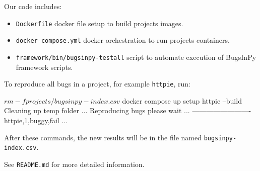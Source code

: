 \documentclass[conference]{IEEEtran}
\begin{document}
Our code includes:
\begin{itemize}
  \item \texttt{Dockerfile} docker file setup to build projects images.
  \item \texttt{docker-compose.yml} docker orchestration to run projects containers.
  \item \texttt{framework/bin/bugsinpy-testall} script to automate execution of BugsInPy framework scripts.
\end{itemize}

To reproduce all bugs in a project, for example \texttt{httpie}, run:

\begin{verbatim*}
$ rm -f projects/bugsinpy-index.csv
$ docker compose up setup httpie --build
Cleaning up temp folder ...
Reproducing bugs please wait ...
-------------------------
httpie,1,buggy,fail
...
\end{verbatim*}

After these commands, the new results will be in the file named \texttt{bugsinpy-index.csv}.

See \texttt{README.md} for more detailed information.
\end{document}
